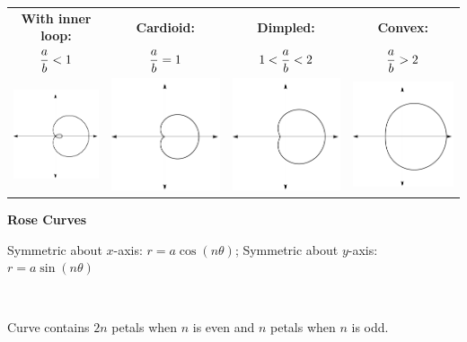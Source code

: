 \begin{tabular}{cccc}
\textbf{With inner loop:} & \textbf{Cardioid:} & \textbf{Dimpled:} & \textbf{Convex:} \\[5pt]
$\displaystyle \frac ab < 1$ & $\displaystyle \frac ab=1$ & $\displaystyle 1<\frac ab <2$ & $\displaystyle \frac ab>2$ \\[10pt]
\includegraphics[width=.22\textwidth]{fig_parametric_10a} & \includegraphics[width=.22\textwidth]{fig_parametric_10b} & \includegraphics[width=.22\textwidth]{fig_parametric_10c} & \includegraphics[width=.22\textwidth]{figures/Parametric/fig_parametric_10d.pdf}
\end{tabular}


\noindent\textbf{\large Rose Curves}\\
\label{Rose_curves}
\parbox{4\gallerywidth}{Symmetric about $x$-axis: $r=a \cos(n\theta)$; \quad Symmetric about $y$-axis:  $r=a\sin(n\theta)$}\\
\parbox{4\gallerywidth}{Curve contains $2n$ petals when $n$ is even and $n$ petals when $n$ is odd.}\\

